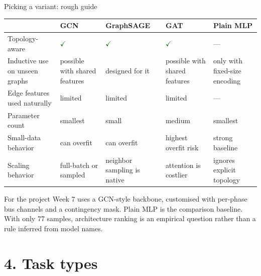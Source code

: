 \documentclass[aspectratio=169,10pt]{beamer}
\newcommand{\checkitem}{\textcolor{darkgreen}{\Large$\checkmark$}\;}
\begin{document}
\begin{frame}{Picking a variant: rough guide}
\centering
\scriptsize
\setlength{\tabcolsep}{2pt}
\begin{tabular}{@{}p{}p{}p{}p{}p{}@{}}
\toprule
 & \textbf{GCN} & \textbf{GraphSAGE} & \textbf{GAT} & \textbf{Plain MLP} \\
\midrule
Topology-aware & \checkitem & \checkitem & \checkitem & --- \\
Inductive use on unseen graphs & possible with shared features & designed for it & possible with shared features & only with fixed-size encoding \\
Edge features used naturally & limited & limited & limited & --- \\
Parameter count & smallest & small & medium & smallest \\
Small-data behavior & can overfit & can overfit & highest overfit risk & strong baseline \\
Scaling behavior & full-batch or sampled & neighbor sampling is native & attention is costlier & ignores explicit topology \\
\bottomrule
\end{tabular}
\vspace{0.7em}
\begin{block}{For the project}
Week 7 uses a GCN-style backbone, customised with per-phase bus channels and a contingency mask. Plain MLP is the comparison baseline. With only 77 samples, architecture ranking is an empirical question rather than a rule inferred from model names.
\end{block}
\end{frame}

\section*{4. Task types}
\end{document}
